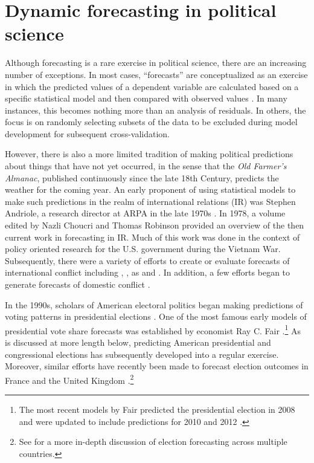 \documentclass[pdftex,12pt,fullpage,oneside]{amsart}
\begin{document}
\section{Dynamic forecasting in political science}

Although forecasting is a rare exercise in political science, there
are an increasing number of exceptions.  In most cases, ``forecasts'' are
conceptualized as an exercise in which the predicted values of a
dependent variable are calculated based on a specific statistical
model and then compared with observed values
\citep[e.g.,][]{Hildebrand:etal:1976}. In many instances, this becomes
nothing more than an analysis of residuals.  In others, the focus is
on randomly selecting subsets of the data to be excluded during model
development for subsequent cross-validation.

However, there is also a more limited tradition of making political
predictions about things that have not yet occurred, in the sense that
the \emph{Old Farmer's Almanac}, published continuously since the late
18th Century, predicts the weather for the coming year. An early
proponent of using statistical models to make such predictions in the
realm of international relations (IR) was Stephen Andriole, a research
director at ARPA in the late 1970s \citep{Andriole:Young:1977}. In
1978, a volume edited by Nazli Choucri and Thomas Robinson
\nocite{Chocuri:Robinson:1978} provided an overview of the then
current work in forecasting in IR.  Much of this work was done in the
context of policy oriented research for the U.S. government during the
Vietnam War.  Subsequently, there were a variety of efforts to create
or evaluate forecasts of international conflict including
\citet{Freeman:Job:1979}, \citet{Singer:Wallace:1979}, as and
\citet{Vincent:1980}.  In addition, a few efforts began to generate
forecasts of domestic conflict \citep[e.g.,][]{Gurr:Lichbach:1986}.

In the 1990s, scholars of American electoral politics began making
predictions of voting patterns in presidential elections
\citep{Campbell:1990, Campbell:1992}. One of the most famous early
models of presidential vote share forecasts was established by
economist Ray C. Fair \citet{Fair:1978}.\footnote{The most recent
  models by Fair predicted the presidential election in 2008
  \citet{Fair:2009} and were updated to include predictions for 2010
  and 2012 \citet{Fair:2010}.} As is discussed at more length below,
predicting American presidential and congressional elections has
subsequently developed into a regular exercise.  Moreover, similar
efforts have recently been made to forecast election outcomes in France
\citep[e.g.,][]{Jerome:1999} and the United Kingdom
\citep[e.g.,][]{Whitely:2005}.\footnote{See \citet{Lewis-Beck:2005}
  for a more in-depth discussion of election forecasting across
  multiple countries.}
\end{document}
